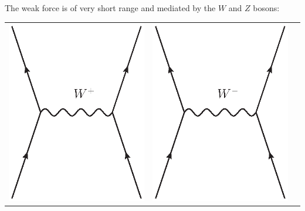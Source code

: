 \documentclass[12pt]{article}
\begin{document}
The weak force is of very short range and mediated by the $W$ and $Z$ bosons:
\begin{center}
	\begin{tabular}{ccc}
		\includegraphics[scale=0.6]{W+_exchange} &
                \includegraphics[scale=0.6]{W-_exchange} & 

\end{tabular}
\end{center}
\end{document}
